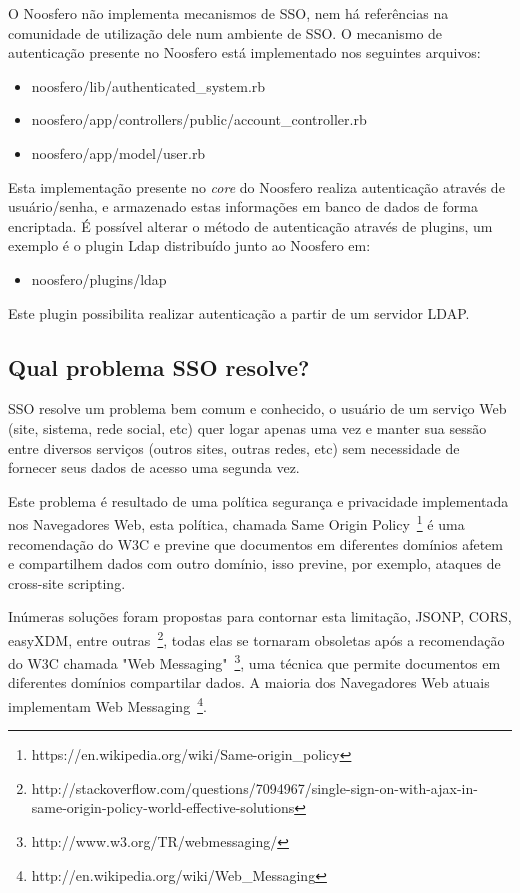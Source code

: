 \documentclass[11pt]{article}
\begin{document}
O Noosfero não implementa mecanismos de SSO, nem há referências na comunidade
de utilização dele num ambiente de SSO. O mecanismo de autenticação presente
no Noosfero está implementado nos seguintes arquivos:

\begin{itemize}
  \item noosfero/lib/authenticated\_system.rb
  \item noosfero/app/controllers/public/account\_controller.rb
  \item noosfero/app/model/user.rb
\end{itemize}

Esta implementação presente no {\it core} do Noosfero realiza autenticação
através de usuário/senha, e armazenado estas informações em banco de dados de
forma encriptada. É possível alterar o método de autenticação através de
plugins, um exemplo é o plugin Ldap distribuído junto ao Noosfero em:

\begin{itemize}
  \item noosfero/plugins/ldap
\end{itemize}

Este plugin possibilita realizar autenticação a partir de um servidor LDAP.

\subsection{Qual problema SSO resolve?}

SSO resolve um problema bem comum e conhecido, o usuário de um serviço Web
(site, sistema, rede social, etc) quer logar apenas uma vez e manter sua
sessão entre diversos serviços (outros sites, outras redes, etc) sem
necessidade de fornecer seus dados de acesso uma segunda vez.

Este problema é resultado de uma política segurança e privacidade implementada
nos Navegadores Web, esta política, chamada Same Origin
Policy~\footnote{https://en.wikipedia.org/wiki/Same-origin\_policy} é uma
recomendação do W3C e previne que documentos em diferentes domínios afetem e
compartilhem dados com outro domínio, isso previne, por exemplo, ataques de
cross-site scripting.

Inúmeras soluções foram propostas para contornar esta limitação, JSONP, CORS,
easyXDM, entre
outras~\footnote{http://stackoverflow.com/questions/7094967/single-sign-on-with-ajax-in-same-origin-policy-world-effective-solutions}, todas elas se tornaram obsoletas após a recomendação do
W3C chamada "Web Messaging"~\footnote{http://www.w3.org/TR/webmessaging/}, uma
técnica que permite documentos em diferentes domínios compartilar dados. A
maioria dos Navegadores Web atuais implementam Web
Messaging~\footnote{http://en.wikipedia.org/wiki/Web\_Messaging}.
\end{document}
